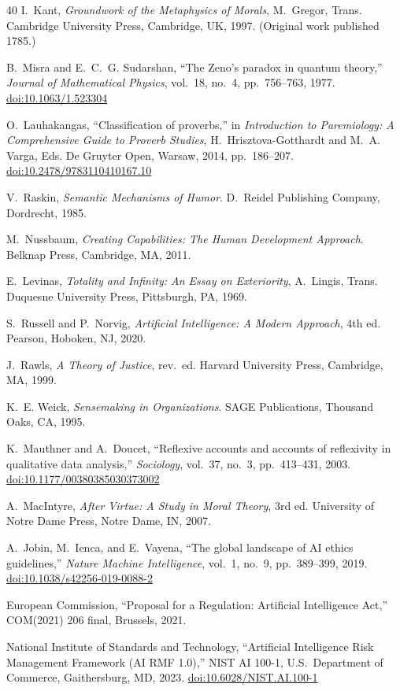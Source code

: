 \documentclass[12pt,a4paper]{article}
\newcommand{\doi}[1]{\href{https://doi.org/#1}{doi:#1}}
\theoremstyle{definition}
\theoremstyle{remark}
\begin{document}
\begin{thebibliography}{40}
I.~Kant,
\emph{Groundwork of the Metaphysics of Morals}, M.~Gregor, Trans.
Cambridge University Press, Cambridge, UK, 1997.
(Original work published 1785.)

B.~Misra and E.~C.~G. Sudarshan,
``The Zeno's paradox in quantum theory,''
\emph{Journal of Mathematical Physics}, vol.~18, no.~4, pp.~756--763, 1977.
\doi{10.1063/1.523304}

O.~Lauhakangas,
``Classification of proverbs,''
in \emph{Introduction to Paremiology: A Comprehensive Guide to Proverb Studies},
H.~Hrisztova-Gotthardt and M.~A. Varga, Eds.
De Gruyter Open, Warsaw, 2014, pp.~186--207.
\doi{10.2478/9783110410167.10}

V.~Raskin,
\emph{Semantic Mechanisms of Humor}.
D.~Reidel Publishing Company, Dordrecht, 1985.

M.~Nussbaum,
\emph{Creating Capabilities: The Human Development Approach}.
Belknap Press, Cambridge, MA, 2011.

E.~Levinas,
\emph{Totality and Infinity: An Essay on Exteriority}, A.~Lingis, Trans.
Duquesne University Press, Pittsburgh, PA, 1969.

S.~Russell and P.~Norvig,
\emph{Artificial Intelligence: A Modern Approach}, 4th ed.
Pearson, Hoboken, NJ, 2020.

J.~Rawls,
\emph{A Theory of Justice}, rev.\ ed.
Harvard University Press, Cambridge, MA, 1999.

K.~E. Weick,
\emph{Sensemaking in Organizations}.
SAGE Publications, Thousand Oaks, CA, 1995.

K.~Mauthner and A.~Doucet,
``Reflexive accounts and accounts of reflexivity in qualitative
data analysis,''
\emph{Sociology}, vol.~37, no.~3, pp.~413--431, 2003.
\doi{10.1177/00380385030373002}

A.~MacIntyre,
\emph{After Virtue: A Study in Moral Theory}, 3rd ed.
University of Notre Dame Press, Notre Dame, IN, 2007.

A.~Jobin, M.~Ienca, and E.~Vayena,
``The global landscape of AI ethics guidelines,''
\emph{Nature Machine Intelligence}, vol.~1, no.~9, pp.~389--399, 2019.
\doi{10.1038/s42256-019-0088-2}

European Commission,
``Proposal for a Regulation: Artificial Intelligence Act,''
COM(2021) 206 final, Brussels, 2021.

National Institute of Standards and Technology,
``Artificial Intelligence Risk Management Framework (AI RMF 1.0),''
NIST AI 100-1, U.S.\ Department of Commerce, Gaithersburg, MD, 2023.
\doi{10.6028/NIST.AI.100-1}

\end{thebibliography}
\end{document}
